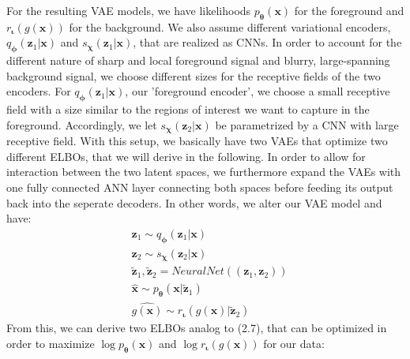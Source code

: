 \documentclass[12pt]{report}
\theoremstyle{definition}
\begin{document}
For the resulting VAE models, we have likelihoods $p_{\pmb{\theta}}(\mathbf{x})$ for the foreground and $r_{\mathbf{\iota}}(g(\mathbf{x}))$ for the background. We also assume different variational encoders, $q_{\pmb{\phi}}(\mathbf{z}_1|\mathbf{x})$ and $s_{\mathbf{\chi}}(\mathbf{z}_1|\mathbf{x})$, that are realized as CNNs. In order to account for the different nature of sharp and local foreground signal and blurry, large-spanning background signal, we choose different sizes for the receptive fields of the two encoders. For $q_{\pmb{\phi}}(\mathbf{z}_1|\mathbf{x})$, our 'foreground encoder', we choose a small receptive field with a size similar to the regions of interest we want to capture in the foreground. Accordingly, we let $s_{\mathbf{\chi}}(\mathbf{z}_2|\mathbf{x})$ be parametrized by a CNN with large receptive field. With this setup, we basically have two VAEs that optimize two different ELBOs, that we will derive in the following. In order to allow for interaction between the two latent spaces, we furthermore expand the VAEs with one fully connected ANN layer connecting both spaces before feeding its output back into the seperate decoders. In other words, we alter our VAE model and have:
\begin{equation}
\begin{split}
& \mathbf{z}_1 \sim q_{\pmb{\phi}}(\mathbf{z}_1|\mathbf{x}) \\
& \mathbf{z}_2 \sim s_{\mathbf{\chi}}(\mathbf{z}_2|\mathbf{x}) \\
& \tilde{\mathbf{z}}_1, \tilde{\mathbf{z}}_2 = NeuralNet((\mathbf{z}_1, \mathbf{z}_2)) \\
& \hat{\mathbf{x}} \sim p_{\pmb{\theta}}(\mathbf{x}|\tilde{\mathbf{z}}_1) \\
& \hat{g(\mathbf{x})} \sim r_{\mathbf{\iota}}(g(\mathbf{x})|\tilde{\mathbf{z}}_2)
\end{split}
\end{equation}
From this, we can derive two ELBOs analog to (2.7), that can be optimized in order to maximize $\log p_{\pmb{\theta}}(\mathbf{x})$ and $\log r_{\mathbf{\iota}}(g(\mathbf{x}))$ for our data:
\end{document}
